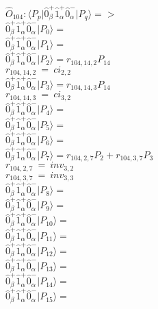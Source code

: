 \documentclass[14pt]{article}
\begin{document}
    $\hat{O}_{104}:  \langle{P_p}\vert \hat{0}_{\beta}^{+}\hat{1}_{\alpha}^{+}\hat{0}_{\alpha}^{-} \vert{P_q}\rangle => $ \\ 
    $ \hat{0}_{\beta}^{+}\hat{1}_{\alpha}^{+}\hat{0}_{\alpha}^{-} \vert{P_{0}}\rangle =  $ \\ 
    $ \hat{0}_{\beta}^{+}\hat{1}_{\alpha}^{+}\hat{0}_{\alpha}^{-} \vert{P_{1}}\rangle =  $ \\ 
    $ \hat{0}_{\beta}^{+}\hat{1}_{\alpha}^{+}\hat{0}_{\alpha}^{-} \vert{P_{2}}\rangle = {r}_{104,14,2}P_{14} $ \\ 
    ${r}_{104,14,2}\ =\ {ci}_{2,2} $ \\ 
    $ \hat{0}_{\beta}^{+}\hat{1}_{\alpha}^{+}\hat{0}_{\alpha}^{-} \vert{P_{3}}\rangle = {r}_{104,14,3}P_{14} $ \\ 
    ${r}_{104,14,3}\ =\ {ci}_{3,2} $ \\ 
    $ \hat{0}_{\beta}^{+}\hat{1}_{\alpha}^{+}\hat{0}_{\alpha}^{-} \vert{P_{4}}\rangle =  $ \\ 
    $ \hat{0}_{\beta}^{+}\hat{1}_{\alpha}^{+}\hat{0}_{\alpha}^{-} \vert{P_{5}}\rangle =  $ \\ 
    $ \hat{0}_{\beta}^{+}\hat{1}_{\alpha}^{+}\hat{0}_{\alpha}^{-} \vert{P_{6}}\rangle =  $ \\ 
    $ \hat{0}_{\beta}^{+}\hat{1}_{\alpha}^{+}\hat{0}_{\alpha}^{-} \vert{P_{7}}\rangle = {r}_{104,2,7}P_{2}+{r}_{104,3,7}P_{3} $ \\ 
    ${r}_{104,2,7}\ =\ {inv}_{3,2} $ \\ 
    ${r}_{104,3,7}\ =\ {inv}_{3,3} $ \\ 
    $ \hat{0}_{\beta}^{+}\hat{1}_{\alpha}^{+}\hat{0}_{\alpha}^{-} \vert{P_{8}}\rangle =  $ \\ 
    $ \hat{0}_{\beta}^{+}\hat{1}_{\alpha}^{+}\hat{0}_{\alpha}^{-} \vert{P_{9}}\rangle =  $ \\ 
    $ \hat{0}_{\beta}^{+}\hat{1}_{\alpha}^{+}\hat{0}_{\alpha}^{-} \vert{P_{10}}\rangle =  $ \\ 
    $ \hat{0}_{\beta}^{+}\hat{1}_{\alpha}^{+}\hat{0}_{\alpha}^{-} \vert{P_{11}}\rangle =  $ \\ 
    $ \hat{0}_{\beta}^{+}\hat{1}_{\alpha}^{+}\hat{0}_{\alpha}^{-} \vert{P_{12}}\rangle =  $ \\ 
    $ \hat{0}_{\beta}^{+}\hat{1}_{\alpha}^{+}\hat{0}_{\alpha}^{-} \vert{P_{13}}\rangle =  $ \\ 
    $ \hat{0}_{\beta}^{+}\hat{1}_{\alpha}^{+}\hat{0}_{\alpha}^{-} \vert{P_{14}}\rangle =  $ \\ 
    $ \hat{0}_{\beta}^{+}\hat{1}_{\alpha}^{+}\hat{0}_{\alpha}^{-} \vert{P_{15}}\rangle =  $ \\ 
    
\end{document}
